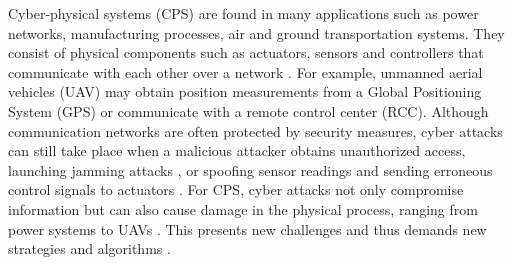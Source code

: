 \documentclass[../../thesis.tex]{subfiles}
\begin{document}

Cyber-physical systems (CPS) are found in many applications such as power networks, manufacturing processes, air and ground transportation systems. They consist of physical components such as actuators, sensors and controllers that communicate with each other over a network \cite{kim2012cyber}. 
For example, unmanned aerial vehicles (UAV) may obtain position measurements from a Global Positioning System (GPS) or communicate with a remote control center (RCC). Although communication networks are often protected by security measures, cyber attacks can still take place when a malicious attacker obtains unauthorized access, launching jamming attacks \cite{Gligor}, or spoofing sensor readings and sending erroneous control signals to actuators \cite{Mo}. For CPS, cyber attacks not only compromise information but can also cause damage in the physical process, ranging from power systems \cite{teixeira2010cyber, liu2011false} to UAVs \cite{Hu:2016uav}. This presents new challenges and thus demands new strategies and algorithms \cite{Sastry}.
\end{document}
